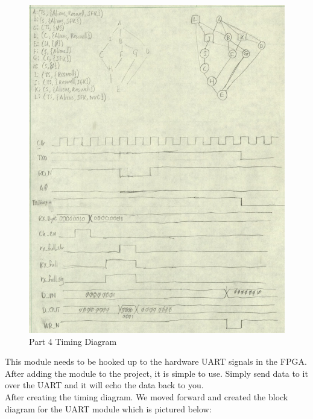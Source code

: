 \documentclass{article}
\begin{document}
	\begin{figure}[h]
		\begin{center}
			\includegraphics[scale=0.6]{../part4_files/part4_timing_diagram.png}
			\caption{Part 4 Timing Diagram}
		\end{center}
	\end{figure}

This module needs to be hooked up to the hardware UART signals in the FPGA. After adding the module to the project, it is simple to use. Simply send data to it over the UART and it will echo the data back to you. \\

After creating the timing diagram. We moved forward and created the block diagram for the UART module which is pictured below:
\end{document}
